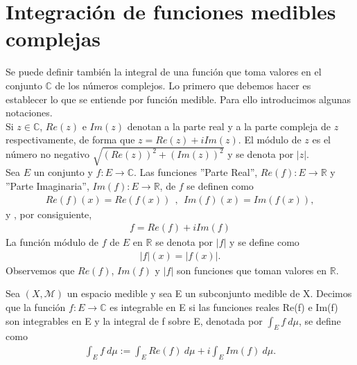 \section{Integración de funciones medibles complejas}

Se puede definir también la integral de una función que toma valores en el conjunto $\mathbb{C}$ de los números complejos. Lo primero que debemos hacer es establecer lo que se entiende por función medible. Para ello introducimos algunas notaciones.
\\
\newline
Si $z \in \mathbb{C}$, $Re(z)$ e $Im(z)$ denotan a la parte real y a la parte compleja de $z$ respectivamente, de forma que $z = Re(z) + iIm(z)$. El módulo de $z$ es el número no negativo $\sqrt{(Re(z))^2 + (Im(z))^2}$ y se denota por $|z|$.
\\
\newline
Sea $E$ un conjunto y $f: E \longrightarrow \mathbb{C}$. Las funciones ''Parte Real'', $Re(f): E \longrightarrow \mathbb{R}$ y ''Parte Imaginaria'', $Im(f): E \longrightarrow \mathbb{R}$, de $f$ se definen como
\begin{align*}
    Re(f)(x) = Re(f(x)) \ \ , \ \ Im(f)(x) = Im(f(x)),
\end{align*}
y , por consiguiente,
\begin{align*}
    f = Re(f) + iIm(f)
\end{align*}
La función módulo de $f$ de $E$ en $\mathbb{R}$ se denota por $|f|$ y se define como
\begin{align*}
    |f|(x) = |f(x)|.
\end{align*}
Observemos que $Re(f)$, $Im(f)$ y $|f|$ son funciones que toman valores en $\mathbb{R}$.

\begin{defi}
Sea $(X, \mathcal{M})$ un espacio medible y sea E un subconjunto medible de X. Decimos que la función $f: E \longrightarrow \mathbb{C}$ es integrable en E si las funciones reales Re(f) e Im(f) son integrables en E y la integral de f sobre E, denotada por $\int_{E}{f \ d\mu}$, se define como
\begin{align*}
    \int_{E}{f \ d\mu} := \int_{E}{Re(f) \ d\mu} + i\int_{E}{Im(f) \ d\mu}.
\end{align*}
\end{defi}

